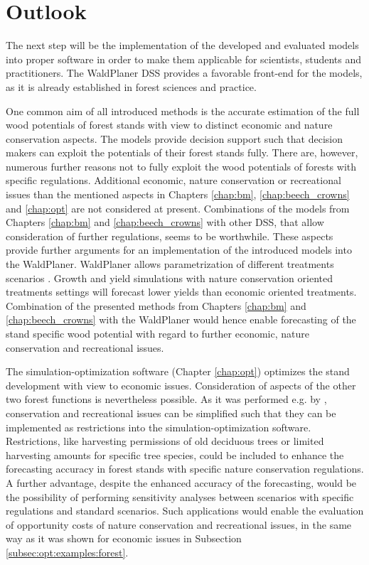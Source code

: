 \section{Outlook}
\label{sec:discussion:outlook}
The next step will be the implementation of the developed and evaluated models into proper software in order to make them applicable for scientists, students and practitioners. The WaldPlaner DSS provides a favorable front-end for the models, as it is already established in forest sciences and practice.

One common aim of all introduced methods is the accurate estimation of the full wood potentials of forest stands with view to distinct economic and nature conservation aspects. The models provide decision support such that decision makers can exploit the potentials of their forest stands fully. There are, however, numerous further reasons not to fully exploit the wood potentials of forests with specific regulations. Additional economic, nature conservation or recreational issues than the mentioned aspects in Chapters \ref{chap:bm}, \ref{chap:beech_crowns} and \ref{chap:opt} are not considered at present. Combinations of the models from Chapters \ref{chap:bm} and \ref{chap:beech_crowns} with other DSS, that allow consideration of further regulations, seems to be worthwhile. These aspects provide further arguments for an implementation of the introduced models into the WaldPlaner. WaldPlaner allows parametrization of different treatments scenarios \citep[p. 90-93]{hansen_2014}. Growth and yield simulations with nature conservation oriented treatments settings will forecast lower yields than economic oriented treatments. Combination of the presented methods from Chapters \ref{chap:bm} and \ref{chap:beech_crowns} with the WaldPlaner would hence enable forecasting of the stand specific wood potential with regard to further economic, nature conservation and recreational issues.

The si\-mu\-la\-tion-op\-ti\-mi\-za\-tion software (Chapter \ref{chap:opt}) optimizes the stand development with view to economic issues. Consideration of aspects of the other two forest functions is nevertheless possible. As it was performed e.g. by \citet{yousefpour_2009}, conservation and recreational issues can be simplified such that they can be implemented as restrictions into the si\-mu\-la\-tion-op\-ti\-mi\-za\-tion software. Restrictions, like harvesting permissions of old deciduous trees or limited harvesting amounts for specific tree species, could be included to enhance the forecasting accuracy in forest stands with specific nature conservation regulations. A further advantage, despite the enhanced accuracy of the forecasting, would be the possibility of performing sensitivity analyses between scenarios with specific regulations and standard scenarios. Such applications would enable the evaluation of opportunity costs of nature conservation and recreational issues, in the same way as it was shown for economic issues in Subsection \ref{subsec:opt:examples:forest}.


